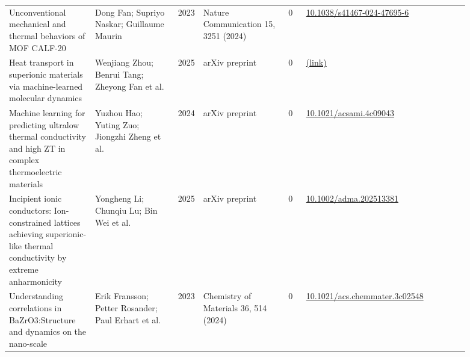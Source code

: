 \documentclass[10pt,a4paper]{article}
\begin{document}
{\begin{longtable}{p{0.192\linewidth}p{0.192\linewidth}p{0.043\linewidth}p{0.192\linewidth}p{0.043\linewidth}p{0.132\linewidth}p{0.096\linewidth}}
Unconventional mechanical and thermal behaviors of MOF CALF-20 & Dong Fan; Supriyo Naskar; Guillaume Maurin & 2023 & Nature Communication 15, 3251 (2024) & 0 & \href{https://doi.org/10.1038/s41467-024-47695-6}{10.1038/s41467-024-47695-6} &  \\
Heat transport in superionic materials via machine-learned molecular dynamics & Wenjiang Zhou; Benrui Tang; Zheyong Fan et al. & 2025 & arXiv preprint & 0 & \href{http://arxiv.org/abs/2512.04718v2}{(link)} &  \\
Machine learning for predicting ultralow thermal conductivity and high ZT in complex thermoelectric materials & Yuzhou Hao; Yuting Zuo; Jiongzhi Zheng et al. & 2024 & arXiv preprint & 0 & \href{https://doi.org/10.1021/acsami.4c09043}{10.1021/acsami.4c09043} &  \\
Incipient ionic conductors: Ion-constrained lattices achieving superionic-like thermal conductivity by extreme anharmonicity & Yongheng Li; Chunqiu Lu; Bin Wei et al. & 2025 & arXiv preprint & 0 & \href{https://doi.org/10.1002/adma.202513381}{10.1002/adma.202513381} &  \\
Understanding correlations in BaZrO3:Structure and dynamics on the nano-scale & Erik Fransson; Petter Rosander; Paul Erhart et al. & 2023 & Chemistry of Materials 36, 514 (2024) & 0 & \href{https://doi.org/10.1021/acs.chemmater.3c02548}{10.1021/acs.chemmater.3c02548} &  \\
\hline
\end{longtable}}
\end{document}
